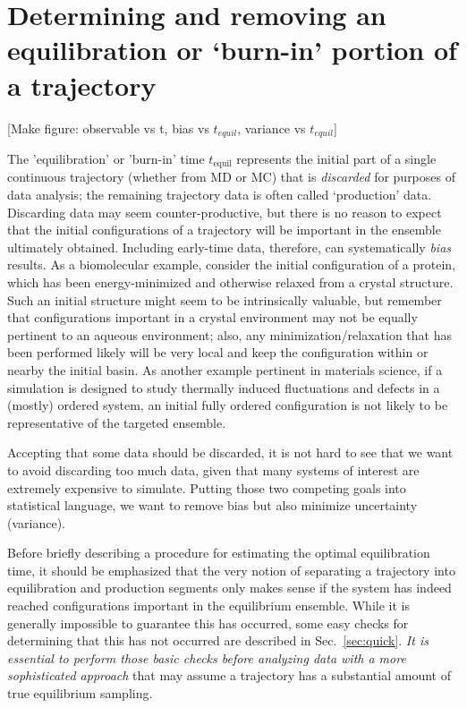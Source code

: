 \section{Determining and removing an equilibration or `burn-in' portion of a trajectory}
\label{sec:equil}

[Make figure: observable vs t, bias vs $t_{equil}$, variance vs $t_{equil}$]

The 'equilibration' or 'burn-in' time $t_{\mathrm{equil}}$ represents the initial part of a single continuous trajectory (whether from MD or MC) that is \emph{discarded} for purposes of data analysis; 
the remaining trajectory data is often called `production' data.
Discarding data may seem counter-productive, but there is no reason to expect that the initial configurations of a trajectory will be important in the ensemble ultimately obtained.
Including early-time data, therefore, can systematically \emph{bias} results.
As a biomolecular example, consider the initial configuration of a protein, which has been energy-minimized and otherwise relaxed from a crystal structure.
Such an initial structure might seem to be intrinsically valuable, but remember that configurations important in a crystal environment may not be equally pertinent to an aqueous environment;
also, any minimization/relaxation that has been performed likely will be very local and keep the configuration within or nearby the initial basin.
As another example pertinent in materials science, if a simulation is designed to study thermally induced fluctuations and defects in a (mostly) ordered system, 
an initial fully ordered configuration is not likely to be representative of the targeted ensemble.

Accepting that some data should be discarded, it is not hard to see that we want to avoid discarding too much data, given that many systems of interest are extremely expensive to simulate.
Putting those two competing goals into statistical language, we want to remove bias but also minimize uncertainty (variance).

Before briefly describing a procedure for estimating the optimal equilibration time, it should be emphasized that the very notion of separating a trajectory into equilibration and production segments
only makes sense if the system has indeed reached configurations important in the equilibrium ensemble.
While it is generally impossible to guarantee this has occurred, some easy checks for determining that this has not occurred are described in Sec.\ \ref{sec:quick}.
\emph{It is essential to perform those basic checks before analyzing data with a more sophisticated approach} that may assume a trajectory has a substantial amount of true equilibrium sampling.


